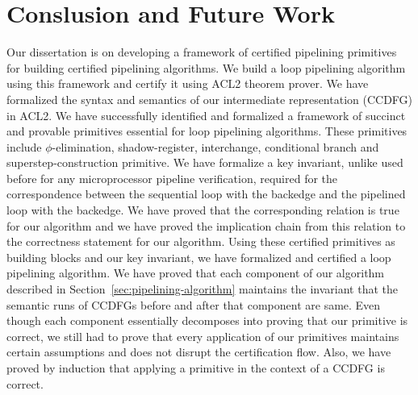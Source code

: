 \chapter{Conslusion and Future Work}
\label{sec:research-plan}

Our dissertation is on developing a framework of certified pipelining primitives for building certified pipelining algorithms. We build a loop pipelining algorithm using this framework and certify it using ACL2 theorem prover. We have formalized the syntax and semantics of our intermediate representation (CCDFG) in ACL2. We have successfully identified and formalized a framework of succinct and provable primitives essential for loop pipelining algorithms. These primitives include $\phi$-elimination, shadow-register, interchange, conditional branch and superstep-construction primitive. We have formalize a key invariant, unlike used before for any microprocessor pipeline verification, required for the correspondence between the sequential loop with the backedge and the pipelined loop with the backedge. We have proved that the corresponding relation is true for our algorithm and we have proved the implication chain from this relation to the correctness statement for our algorithm. Using these certified primitives as building blocks and our key invariant, we have formalized and certified a loop pipelining algorithm.
We have proved that each component of our algorithm described in Section~\ref{sec:pipelining-algorithm} maintains the invariant that the semantic runs of CCDFGs before and after that component are same. Even though each component essentially decomposes into proving that our primitive is correct, we still had to prove that every application of our primitives maintains certain assumptions and does not disrupt the certification flow. Also, we have proved by induction that applying a primitive in the context of a CCDFG is correct.


